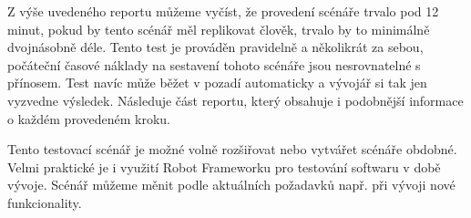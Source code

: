 Z výše uvedeného reportu můžeme vyčíst, že provedení scénáře trvalo pod 12 minut, pokud by tento scénář měl replikovat člověk, trvalo by to minimálně dvojnásobně déle. Tento test je prováděn pravidelně a několikrát za sebou, počáteční časové náklady na sestavení tohoto scénáře jsou nesrovnatelné s přínosem. Test navíc může běžet v pozadí automaticky a vývojář si tak jen vyzvedne výsledek. Následuje část reportu, který obsahuje i podobnější informace o každém provedeném kroku.


Tento testovací scénář je možné volně rozšiřovat nebo vytvářet scénáře obdobné. Velmi praktické je i využití Robot Frameworku pro testování softwaru v době vývoje. Scénář můžeme měnit podle aktuálních požadavků např. při vývoji nové funkcionality.

